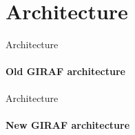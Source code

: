 \section{Architecture}
    \begin{frame}[t]{Architecture}\framesubtitle{Old GIRAF architecture}
    \end{frame}

    \begin{frame}[t]{Architecture}\framesubtitle{New GIRAF architecture}
    	\begin{figure}
    		\scalebox{0.6}{%
        	}
        \end{figure}
    \end{frame}
